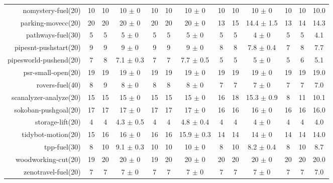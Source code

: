 \begin{center}
\begin{tabular}{|r|*{4}{ccc|}}
nomystery-fuel(20) & 10 & 10 & 10 \(\pm\) 0 & 10 & 10 & 10 \(\pm\) 0 & 10 & 10 & 10 \(\pm\) 0 & 10 & 10 & 10.0\\
parking-movecc(20) & 20 & 20 & 20 \(\pm\) 0 & 20 & 20 & 20 \(\pm\) 0 & 13 & 15 & 14.4 \(\pm\) 1.5 & 13 & 14 & 14.3\\
pathways-fuel(30) & 5 & 5 & 5 \(\pm\) 0 & 5 & 5 & 5 \(\pm\) 0 & 5 & 5 & 4 \(\pm\) 0 & 5 & 5 & 4.1\\
pipesnt-pushstart(20) & 9 & 9 & 9 \(\pm\) 0 & 9 & 9 & 9 \(\pm\) 0 & 8 & 8 & 7.8 \(\pm\) 0.4 & 7 & 8 & 7.7\\
pipesworld-pushend(20) & 7 & 8 & 7.1 \(\pm\) 0.3 & 7 & 7 & 7.7 \(\pm\) 0.5 & 5 & 5 & 5 \(\pm\) 0 & 5 & 6 & 5.1\\
psr-small-open(20) & 19 & 19 & 19 \(\pm\) 0 & 19 & 19 & 19 \(\pm\) 0 & 19 & 19 & 19 \(\pm\) 0 & 19 & 19 & 19.0\\
rovers-fuel(40) & 8 & 9 & 8 \(\pm\) 0 & 8 & 8 & 8 \(\pm\) 0 & 7 & 7 & 7 \(\pm\) 0 & 7 & 7 & 7.0\\
scanalyzer-analyze(20) & 15 & 15 & 15 \(\pm\) 0 & 15 & 15 & 15 \(\pm\) 0 & 16 & 18 & 15.3 \(\pm\) 0.9 & 8 & 11 & 10.1\\
sokoban-pushgoal(20) & 17 & 17 & 17 \(\pm\) 0 & 17 & 17 & 17 \(\pm\) 0 & 16 & 16 & 16 \(\pm\) 0 & 16 & 16 & 16.0\\
storage-lift(20) & 4 & 4 & 4.3 \(\pm\) 0.5 & 4 & 4 & 4.8 \(\pm\) 0.4 & 4 & 4 & 4 \(\pm\) 0 & 4 & 4 & 4.0\\
tidybot-motion(20) & 15 & 16 & 16 \(\pm\) 0 & 16 & 16 & 15.9 \(\pm\) 0.3 & 14 & 14 & 14 \(\pm\) 0 & 14 & 14 & 14.0\\
tpp-fuel(30) & 8 & 10 & 9.1 \(\pm\) 0.3 & 10 & 10 & 10 \(\pm\) 0 & 8 & 10 & 8.2 \(\pm\) 0.4 & 8 & 10 & 8.7\\
woodworking-cut(20) & 19 & 20 & 20 \(\pm\) 0 & 19 & 20 & 20 \(\pm\) 0 & 20 & 20 & 20 \(\pm\) 0 & 20 & 20 & 20.0\\
zenotravel-fuel(20) & 7 & 7 & 7 \(\pm\) 0 & 7 & 7 & 7 \(\pm\) 0 & 7 & 7 & 7 \(\pm\) 0 & 7 & 7 & 7.0\\
\end{tabular}
\end{center}
